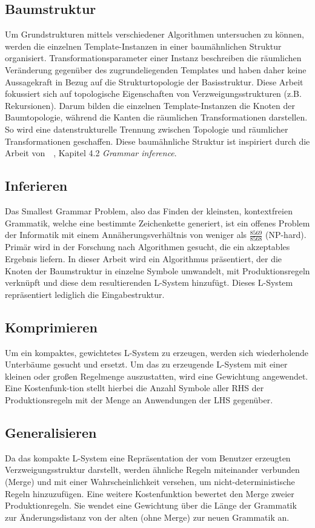 \subsection*{Baumstruktur}
Um Grundstrukturen mittels verschiedener Algorithmen untersuchen zu können, werden die einzelnen Template-Instanzen in
einer baumähnlichen Struktur organisiert.
Transformationsparameter einer Instanz beschreiben die räumlichen Veränderung gegenüber des zugrundeliegenden Templates
und haben daher keine Aussagekraft in Bezug auf die Strukturtopologie der Basisstruktur.
Diese Arbeit fokussiert sich auf topologische Eigenschaften von Verzweigungsstrukturen (z.B. Rekursionen).
Darum bilden die einzelnen Template-Instanzen die Knoten der Baumtopologie, während die Kanten die räumlichen Transformationen
darstellen.
So wird eine datenstrukturelle Trennung zwischen Topologie und räumlicher Transformationen geschaffen.
Diese baumähnliche Struktur ist inspiriert durch die Arbeit von~\citeauthor{guo_2020}~\cite{guo_2020}, Kapitel 4.2 \textit{Grammar inference}.

\subsection*{Inferieren}
Das Smallest Grammar Problem, also das Finden der kleinsten, kontextfreien Grammatik, welche eine bestimmte Zeichenkette
generiert, ist ein offenes Problem der Informatik mit einem Annäherungsverhältnis von weniger als $\frac{8569}{8568}$
(NP-hard)\cite{charikar_2005}.
Primär wird in der Forschung nach Algorithmen gesucht, die ein akzeptables Ergebnis liefern.
In dieser Arbeit wird ein Algorithmus präsentiert, der die Knoten der Baumstruktur in einzelne Symbole umwandelt, mit
Produktionsregeln verknüpft und diese dem resultierenden L-System hinzufügt.
Dieses L-System repräsentiert lediglich die Eingabestruktur.

\newpage

\subsection*{Komprimieren}
Um ein kompaktes, gewichtetes L-System zu erzeugen, werden sich wiederholende Unterbäume gesucht und ersetzt.
Um das zu erzeugende L-System mit einer kleinen oder großen Regelmenge auszustatten, wird eine Gewichtung angewendet.
Eine Kostenfunk-tion stellt hierbei die Anzahl Symbole aller RHS der Produktionsregeln mit der Menge an Anwendungen der
LHS gegenüber.

\subsection*{Generalisieren}
Da das kompakte L-System eine Repräsentation der vom Benutzer erzeugten Verzweigungsstruktur darstellt, werden ähnliche
Regeln miteinander verbunden (Merge) und mit einer Wahrscheinlichkeit versehen, um nicht-deterministische Regeln hinzuzufügen.
Eine weitere Kostenfunktion bewertet den Merge zweier Produktionregeln.
Sie wendet eine Gewichtung über die Länge der Grammatik zur Änderungsdistanz von der alten (ohne Merge) zur neuen Grammatik an.

